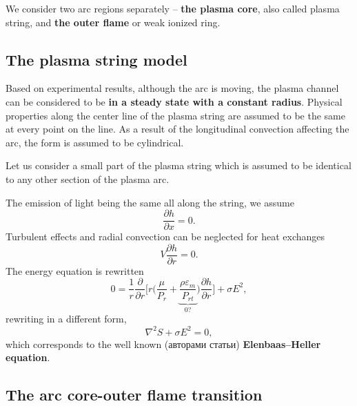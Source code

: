 We consider two arc regions separately -- 
\textbf{the plasma core}, 
also called plasma string, 
and 
\textbf{the outer flame} or weak ionized ring.




\subsection{The plasma string model}

Based on experimental results, although the arc is moving, the plasma channel can be considered to be \textbf{in a steady state with a constant radius}. Physical properties along the center line of the plasma string are assumed to be the same at
every point on the line. As a result of the longitudinal convection affecting the arc, the form is assumed to be cylindrical.

Let us consider a small part of the plasma string which is assumed to be identical to any other section of the plasma arc.

The emission of light being the same all along the string,
we assume
\begin{equation}
    \frac{\partial h}{\partial x} = 0.
\end{equation}
Turbulent effects and radial convection can be neglected for heat exchanges
\begin{equation}
    V \frac{\partial h}{\partial r} = 0.
\end{equation}
The energy equation is rewritten
\begin{equation}
    0   =
    \frac{1}{r} \frac{\partial }{\partial r} 
    \bigg[
        r \bigg(\frac{\mu}{P_r} + 
        \underbrace{\frac{\rho \varepsilon_m}{P_{rt}}}_{0?}
        \bigg) 
        \frac{\partial h}{\partial r} 
    \bigg] + \sigma E^2,
\end{equation}
rewriting in a different form,
\begin{equation}
    \nabla^2 S + \sigma E^2 = 0,
\end{equation}
which corresponds to the well known (авторами статьи) \textbf{Elenbaas–Heller equation}.


\subsection{The arc core-outer flame transition}

